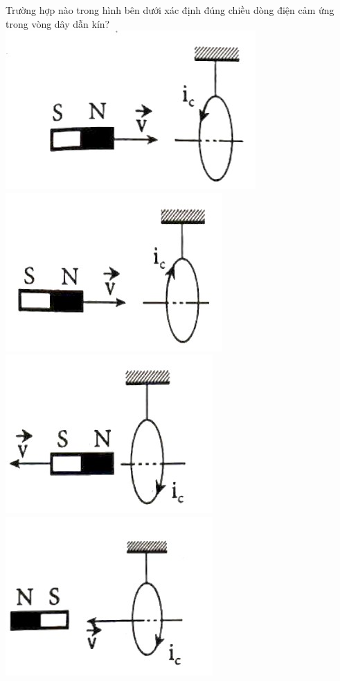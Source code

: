 \begin{ex}
	Trường hợp nào trong hình bên dưới xác định đúng chiều dòng điện cảm ứng trong vòng dây dẫn kín?
	\choice
	{\includegraphics[width=0.42\linewidth]{figs/VN12-Y24-PH-SYL-020P-12a}}
	{\True \includegraphics[width=0.42\linewidth]{figs/VN12-Y24-PH-SYL-020P-12b}}
	{\includegraphics[width=0.42\linewidth]{figs/VN12-Y24-PH-SYL-020P-12c}}
	{\includegraphics[width=0.42\linewidth]{figs/VN12-Y24-PH-SYL-020P-12d}}
	\loigiai{}
\end{ex}
